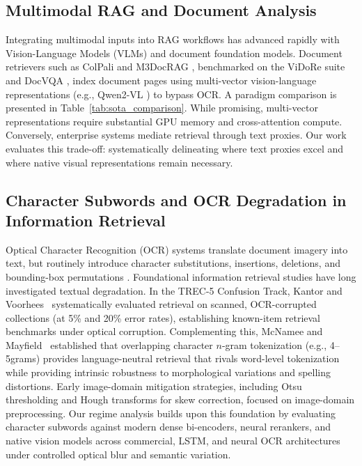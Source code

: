 \subsection{Multimodal RAG and Document Analysis}
Integrating multimodal inputs into RAG workflows has advanced rapidly with Vision-Language Models (VLMs) and document foundation models. Document retrievers such as ColPali \cite{faysse2024colpali} and M3DocRAG \cite{cho2024m3docrag}, benchmarked on the ViDoRe suite \cite{faysse2024colpali} and DocVQA \cite{mathew2021docvqa}, index document pages using multi-vector vision-language representations (e.g., Qwen2-VL \cite{wang2024qwen2vl}) to bypass OCR. A paradigm comparison is presented in Table~\ref{tab:sota_comparison}. While promising, multi-vector representations require substantial GPU memory and cross-attention compute. Conversely, enterprise systems \cite{patel2025multimodal, joshi2024multimodel} mediate retrieval through text proxies. Our work evaluates this trade-off: systematically delineating where text proxies excel and where native visual representations remain necessary.



\subsection{Character Subwords and OCR Degradation in Information Retrieval}
Optical Character Recognition (OCR) systems translate document imagery into text, but routinely introduce character substitutions, insertions, deletions, and bounding-box permutations \cite{smith2007tesseract, fateh2024ocr}. Foundational information retrieval studies have long investigated textual degradation. In the TREC-5 Confusion Track, Kantor and Voorhees~\cite{kantor2000confusion} systematically evaluated retrieval on scanned, OCR-corrupted collections (at 5\% and 20\% error rates), establishing known-item retrieval benchmarks under optical corruption. Complementing this, McNamee and Mayfield~\cite{mcnamee2004character} established that overlapping character $n$-gram tokenization (e.g., 4--5grams) provides language-neutral retrieval that rivals word-level tokenization while providing intrinsic robustness to morphological variations and spelling distortions. Early image-domain mitigation strategies, including Otsu thresholding \cite{otsu1979} and Hough transforms \cite{hough1962} for skew correction, focused on image-domain preprocessing. Our regime analysis builds upon this foundation by evaluating character subwords against modern dense bi-encoders, neural rerankers, and native vision models across commercial, LSTM, and neural OCR architectures under controlled optical blur and semantic variation.

